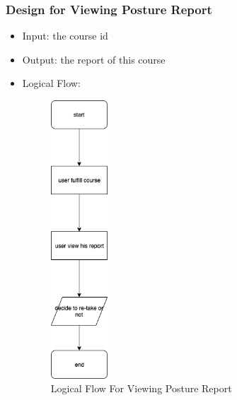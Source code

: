 \documentclass[16pt]{scrreprt}
\begin{document}
\subsubsection{Design for Viewing Posture Report}
\begin{itemize}
    \item Input: the course id
    \item Output: the report of this course
    \item Logical Flow:
    \begin{figure}[H]
        \centering
        \includegraphics[width=0.2\textwidth]{diagrams/flow-ViewReport.png}
        \caption{Logical Flow For Viewing Posture Report}
    \end{figure}
\end{itemize}
\end{document}
